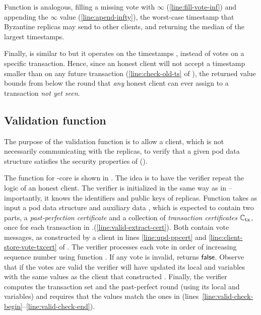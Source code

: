 Function \opMaxPossibleTs{} is analogous, filling a missing vote with $\infty$ (\cref{line:fill-vote-inf})
and appending the $\infty$ value (\cref{line:apend-infty}), the worst-case timestamp that Byzantine replicas may send to other clients,
and returning the median of the \alpha largest timestamps.

Finally, \opMinPossibleTsForNewTx{} is similar to \opMinPossibleTs{} but it operates on the timestamps \mrt, instead of votes on a specific transaction. Hence, since an honest client will not accept a timestamp smaller than \mrt on any future transaction (\cref{line:check-old-ts} of ), the returned value bounds from below the \confirmed round that \emph{any} honest client can ever assign to a transaction \emph{not yet seen}.



\subsection{Validation function}
The purpose of the validation function \opValid{} is to allow a client, which is not necessarily communicating with the \podtm replicas, to verify that a given pod data structure \Pod satisfies the security properties of \podtm ().



The function \opValid{} for \podtm-core is shown in .
The idea is to have the verifier repeat the logic of an honest client.
The verifier is initialized in the same way as in  -- importantly, it knows the identifiers and public keys of \podtm replicas.
Function \opValid{} takes as input a pod data structure \Pod and auxiliary data \cert,
which is expected to contain two parts, a \emph{past-perfection certificate} \ppcert and a collection of \emph{transaction certificates} $\mathbb{C}_\text{tx}$, once for each transaction in \Pod.\txSet (\cref{line:valid-extract-cert}).
Both contain vote messages, as constructed by a \podtm client in lines \ref{line:upd-ppcert} and \ref{line:client-store-vote-txcert} of .
The verifier processes each vote in order of increasing sequence number \sn using function \opProcessVote{}. If any vote is invalid, \opValid{} returns $\mathsf{false}$.
Observe that if the votes are valid the verifier will have updated its local \tsps and \mrt variables with the same values as the \podtm client that constructed \Pod.
Finally, the verifier computes the transaction set \txSet and the past-perfect round \rperf (using its local \tsps and \mrt variables) and requires that the values match the ones in \Pod (lines~\ref{line:valid-check-begin}--\ref{line:valid-check-end}).

